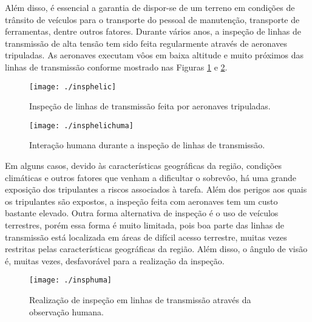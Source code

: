 Além disso, é essencial a garantia de dispor-se de um terreno em condições de trânsito de veículos para o transporte do pessoal de manutenção, transporte de ferramentas, dentre outros fatores. 
Durante vários anos, a inspeção de linhas de transmissão de alta tensão tem sido feita regularmente através de aeronaves tripuladas. As aeronaves executam vôos em baixa altitude e muito próximos das linhas de transmissão conforme mostrado nas  Figuras \ref{img:ihelic} e \ref{img:ihelichuma}.

\begin{figure}[h!]												
	\centering												
	\texttt{[image: ./insphelic]}				
	\caption{Inspeção de linhas de transmissão feita por aeronaves tripuladas.}	
	\label{img:ihelic}												
\end{figure}													
	
\begin{figure} [h!]												 
	\centering													 
	\texttt{[image: ./insphelichuma]}				 
	\caption{Interação humana durante a inspeção de linhas de transmissão.}		
	\label{img:ihelichuma}												 
\end{figure}													 

Em alguns casos, devido às características geográficas da região, condições climáticas e outros fatores que venham a dificultar o sobrevôo, há uma grande exposição dos tripulantes a riscos associados à tarefa. Além dos perigos aos quais os tripulantes são expostos, a inspeção feita com aeronaves tem um custo bastante elevado. Outra forma alternativa de inspeção é o uso de veículos terrestres, porém essa forma é muito limitada, pois boa parte das linhas de transmissão está localizada em áreas de difícil acesso terrestre, muitas vezes restritas pelas características geográficas da região. Além disso, o ângulo de visão é, muitas vezes, desfavorável para a realização da inspeção.

\begin{figure} [h!]												 
	\centering													 
	\texttt{[image: ./insphuma]}				 
	\caption{Realização de inspeção em linhas de transmissão através da observação humana.}		
	\label{img:ihuma}												 
\end{figure}													 

